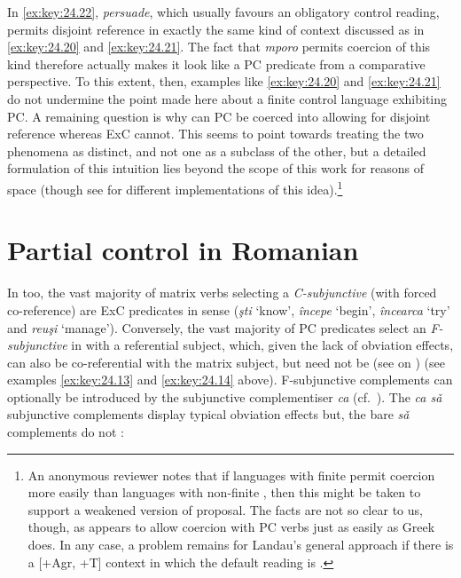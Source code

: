 \documentclass[output=paper]{langsci/langscibook}
\begin{document}
In \eqref{ex:key:24.22}, \emph{persuade}, which usually favours an obligatory
control reading, permits disjoint reference in exactly the same kind of context
discussed as in \eqref{ex:key:24.20} and \eqref{ex:key:24.21}. The fact that
\emph{mporo} permits coercion of this kind therefore actually makes it look
like a \gls{PC} predicate from a comparative
perspective.  To this extent, then, examples like \eqref{ex:key:24.20} and
\eqref{ex:key:24.21} do not undermine the point made here about a finite
control language exhibiting PC. A remaining question is why can
\gls{PC} be coerced into allowing for disjoint
reference whereas \gls{ExC} cannot. This seems
to point towards treating the two phenomena as distinct, and not one as a
subclass of the other, but a detailed formulation of this intuition lies beyond
the scope of this work for reasons of space (though see
\citealt{Cinque2006,Landau2000,Landau2008,Landau2015,Sheehan2018b} for
different implementations of this idea).\footnote{An anonymous reviewer notes
    that if languages with finite  permit coercion more easily than
    languages with non-finite , then this might be taken to support a
    weakened version of  proposal. The facts are not so
    clear to us, though, as  appears to allow coercion with
\gls{PC} verbs just as easily as Greek does. In any
case, a problem remains for Landau’s general approach if there is a [+Agr, +T]
context in which the default reading is .}

\section{Partial control in Romanian}\label{sec:key:24.4}

In  too, the vast majority of matrix verbs selecting a
\emph{C-subjunctive} (with forced co-reference) are
\gls{ExC} predicates in 
sense (\emph{şti} ‘know’, \emph{începe} ‘begin’, \emph{încearca} ‘try’ and
\emph{reuş}\emph{i} ‘manage’). Conversely, the vast majority of
\gls{PC} predicates select an \emph{F-subjunctive}
in  with a referential subject, which, given the lack of obviation
effects, can also be co-referential with the matrix subject, but need not be
(see \citealt{Alboiu2007,AlexiadouEtAl2010,Hill2012,Nicolae2013}
on ) (see examples \eqref{ex:key:24.13} and \eqref{ex:key:24.14}
above). F-subjunctive complements can optionally be introduced by the
subjunctive complementiser \emph{ca} (cf.\
\citealt{GrosuHorvath1987,Hill2012}). The \emph{ca sǎ} subjunctive complements
display typical \ili{Romance} obviation effects but, the bare \emph{sǎ} complements
do not \citep{AlexiadouEtAl2010}:
\end{document}
